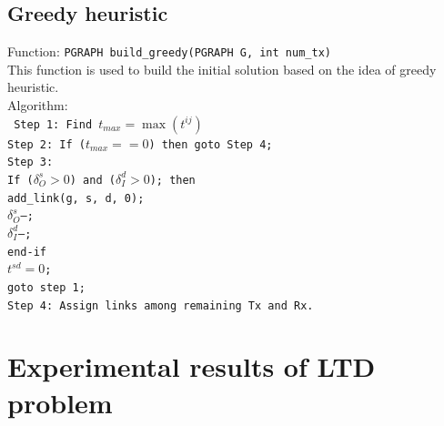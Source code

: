 \documentclass[a4paper]{article}
\begin{document}
  \subsection{Greedy heuristic}
  Function: \texttt{PGRAPH build\_greedy(PGRAPH G, int num\_tx)}\\
  This function is used to build the initial solution based on the idea of greedy heuristic.\\
  Algorithm: \\
  \texttt{
  Step 1: Find $t_{max} = \max (t^{ij})$ \\
  Step 2: If ($t_{max} == 0$) then goto Step 4;\\
  Step 3: \\
  \indent If ($\delta_O^s > 0$) and ($\delta_I^d > 0$); then\\
  \indent \indent add\_link(g, s, d, 0);\\
  \indent \indent  $\delta_O^s$--;\\
  \indent \indent  $\delta_I^d$--; \\
  \indent end-if\\
  \indent $t^{sd} = 0$;\\
  \indent goto step 1;\\
  Step 4: Assign links among remaining Tx and Rx.  
  }
  \section{Experimental results of LTD problem}
\end{document}
